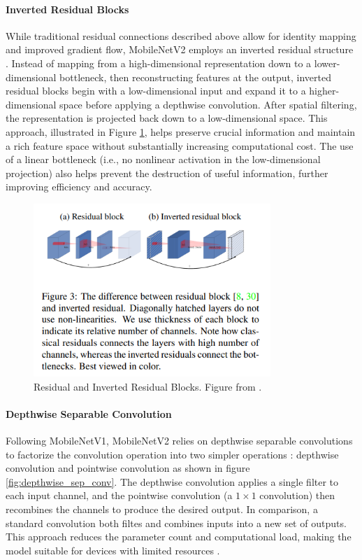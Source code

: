 \paragraph{Inverted Residual Blocks}
While traditional residual connections described above allow for identity mapping and improved gradient flow, MobileNetV2 employs an inverted residual structure \cite{sandler2018mobilenetv2}. Instead of mapping from a high-dimensional representation down to a lower-dimensional bottleneck, then reconstructing features at the output, inverted residual blocks begin with a low-dimensional input and expand it to a higher-dimensional space before applying a depthwise convolution. After spatial filtering, the representation is projected back down to a low-dimensional space. This approach, illustrated in Figure \ref{fig:residual}, helps preserve crucial information and maintain a rich feature space without substantially increasing computational cost. The use of a linear bottleneck (i.e., no nonlinear activation in the low-dimensional projection) also helps prevent the destruction of useful information, further improving efficiency and accuracy.  

\begin{figure}[ht]
    \centering
    \includegraphics[width=0.8\textwidth]{Images/inverted_residual.png} 
    \caption{Residual and Inverted Residual Blocks. Figure from \cite{sandler2018mobilenetv2}. }
    \label{fig:residual}
\end{figure}

\paragraph{Depthwise Separable Convolution}
Following MobileNetV1, MobileNetV2 relies on depthwise separable convolutions to factorize the convolution operation into two simpler operations \cite{howard2017mobilenetsefficientconvolutionalneural}: depthwise convolution and pointwise convolution as shown in figure \ref{fig:depthwise_sep_conv}. The depthwise convolution applies a single filter to each input channel, and the pointwise convolution (a $1\times 1$ convolution) then recombines the channels to produce the desired output. In comparison, a standard convolution both filtes and combines inputs into a new set of outputs. This approach reduces the parameter count and computational load, making the model suitable for devices with limited resources \cite{howard2017mobilenetsefficientconvolutionalneural,sandler2018mobilenetv2}.


